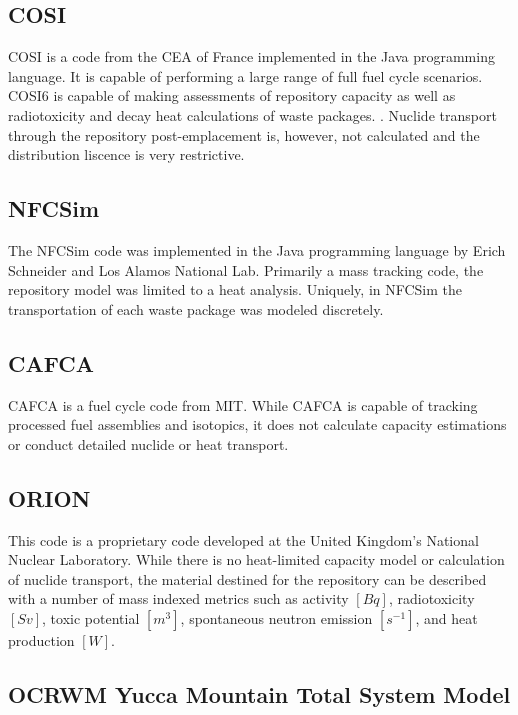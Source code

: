 \subsection{COSI}

\gls{COSI} is a code from the CEA of France implemented in the Java programming 
language. It is capable of performing a large range of full fuel cycle 
scenarios. COSI6 is capable of making assessments of repository capacity as 
well as radiotoxicity and decay heat calculations of waste packages. 
\cite{boucher_international_2010}. Nuclide transport through the repository 
post-emplacement is, however, not calculated and the distribution liscence is 
very restrictive.


\subsection{NFCSim}

The \gls{NFCSim} code was implemented in the Java programming language by Erich 
Schneider and Los Alamos National Lab. Primarily a mass tracking code, the 
repository model was limited to a heat analysis. Uniquely, in NFCSim the 
transportation of each waste package was modeled discretely. 
\cite{schneider_nfcsim_2004}

\subsection{CAFCA}

\gls{CAFCA} is a fuel cycle code from MIT. While \gls{CAFCA} is capable of 
tracking processed fuel assemblies and isotopics, it does not calculate 
capacity estimations or conduct detailed nuclide or heat transport.  

\subsection{ORION} 

This code is a proprietary code developed at the United
Kingdom's National Nuclear Laboratory. While there is no heat-limited capacity 
model or calculation of nuclide transport, the material destined for the 
repository can be described with a number of mass indexed metrics such as activity 
$[Bq]$, radiotoxicity $[Sv]$,  toxic potential $[m^3]$, spontaneous neutron emission 
$[s^{-1}]$, and heat production $[W]$.



\subsection{OCRWM Yucca Mountain Total System Model}


